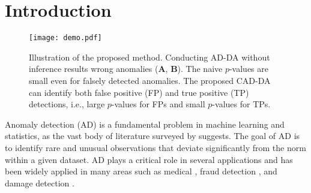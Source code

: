 
\section{Introduction} \label{sec:intro}


\begin{figure*}[!t]
\centering
\texttt{[image: demo.pdf]}
\caption{Illustration of the proposed method.
%
Conducting AD-DA without inference results wrong anomalies (\textbf{A}, \textbf{B}).
%
The naive $p$-values are small even for falsely detected anomalies.
%
The proposed CAD-DA can identify both false positive (FP) and true positive (TP) detections, i.e., large $p$-values for FPs and small $p$-values for TPs.
}
\label{fig:illustration}
\vspace{-5pt}
\end{figure*}

%

Anomaly detection (AD) is a fundamental problem in machine learning and statistics, as the vast body of literature surveyed by \cite{aggarwal2017outlier} suggests.
%
%
%
%
%
The goal of AD is to identify rare and unusual observations that deviate significantly from the norm within a given dataset.
AD plays a critical role in several applications and has been widely applied in many areas such as medical \cite{wong2002rule, aggarwal2005abnormality}, fraud detection \cite{pourhabibi2020fraud}, and damage detection \cite{avci2021review, du2020damage}.


